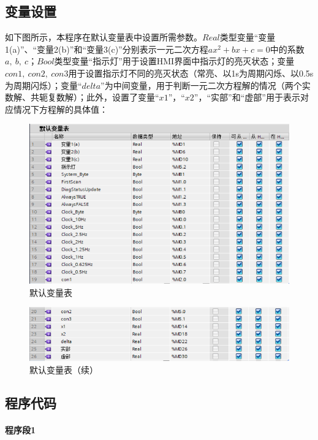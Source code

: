 \documentclass[UTF8]{article}
\begin{document}
\subsection{变量设置}
如下图所示，本程序在默认变量表中设置所需参数。$Real$类型变量“变量1(a)”、“变量2(b)”和“变量3(c)”分别表示一元二次方程$ax^2 + bx + c = 0$中的系数$a,\ b,\ c$；$Bool$类型变量“指示灯”用于设置HMI界面中指示灯的亮灭状态；变量$con1,\ con2,\ con3$用于设置指示灯不同的亮灭状态（常亮、以1s为周期闪烁、以0.5s为周期闪烁）；变量“$delta$”为中间变量，用于判断一元二次方程解的情况（两个实数解、共轭复数解）；此外，设置了变量“$x1$”，“$x2$”，“实部”和“虚部”用于表示对应情况下方程解的具体值：
\begin{figure}[H]
    \centering %
    \includegraphics[width=.8\textwidth]{figure/默认变量表1.png} 
    \caption{默认变量表} %
\end{figure}
\begin{figure}[H]
    \centering %
    \includegraphics[width=.8\textwidth]{figure/默认变量表2.png} 
    \caption{默认变量表（续）} %
\end{figure}


\subsection{程序代码}
\paragraph{程序段1}~{}
\end{document}
